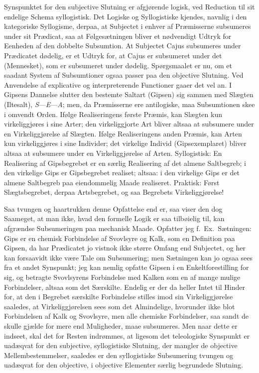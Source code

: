 \documentclass[12pt]{book}
\newcommand{\opage}[1]{\marginnote{\footnotesize\textit{[#1]}}}
\begin{document}
Synspunktet for den subjective Slutning er afgjørende logisk, ved Reduction til sit endelige Schema syllogistisk. Det Logiske og Syllogistiske kjendes, navnlig i den kategoriske Syllogisme, derpaa, at Subjectet i enhver af Præmisserne subsumeres under sit Prædicat, saa at Følgesætningen bliver et nødvendigt Udtryk for Eenheden af den dobbelte Subsumtion. At Subjectet Cajus subsumeres under Prædicatet dødelig, er et Udtryk for, at Cajus er subsumeret under det (Mennesket), som er subsumeret under dødelig. Spørgsmaalet er nu, om et saadant System af Subsumtioner ogsaa passer paa den objective Slutning. Ved Anvendelse af explicative og interpreterende Functioner gaaer det vel an. I Gipsens Dannelse slutter den bestemte Saltart (Gipsen) sig sammen med Slægten (Iltesalt), \textit{S}---\textit{E}---\textit{A}; men, da Præmisserne ere antilogiske, maa Subsumtionen skee i omvendt Orden. Ifølge Realiseringens første Præmis, kan Slægten kun virkeliggjøres i sine Arter; den virkeliggjorte Art bliver altsaa at subsumere under en Virkeliggjørelse af Slægten. Ifølge Realiseringens anden Præmis, kan Arten kun virkeliggjøres i sine Individer; det virkelige Individ (Gipsexemplaret) bliver altsaa at subsumere under en Virkeliggjørelse af Arten. Syllogistisk: En Realisering af Gipsbegrebet er en særlig Realisering af det almene Saltbegreb; i den virkelige Gips er Gipsbegrebet realiset; %
altsaa: i den virkelige Gips er det almene Saltbegreb paa eiendommelig Maade realiseret. Praktisk: Først Slægtsbegrebet, derpaa Artsbegrebet, og saa Begrebets Virkeliggjørelse!

Saa tvungen og haartrukken denne Opfattelse end er, saa viser den dog Saameget, at man ikke, hvad den formelle Logik er saa tilbøielig til, kan afgrændse Subsumeringen paa mechanisk Maade. Opfatter jeg f.\ Ex.\ Sætningen: Gips er en chemisk Forbindelse af Svovlsyre og Kalk, som en Definition paa Gipsen, da har Prædicatet jo vistnok ikke større Omfang end
\opage{399}Subjectet, og her kan forsaavidt ikke være Tale om Subsumering; men Sætningen kan jo ogsaa sees fra et andet Synspunkt; jeg kan nemlig opfatte Gipsen i en Enkeltforestilling for sig, og betragte Svovlsyrens Forbindelse med Kalken som en af mange mulige Forbindelser, altsaa som det Særskilte. Endelig er der da heller Intet til Hinder for, at den i Begrebet særskilte Forbindelse stilles imod sin Virkeliggjørelse saaledes, at Virkeliggjørelsen sees som det Almindelige, hvorunder ikke blot Forbindelsen af Kalk og Svovlsyre, men alle chemiske Forbindelser, saa sandt de skulle gjælde for mere end Muligheder, maae subsumeres. Men naar dette er indseet, skal det for Resten indrømmes, at ligesom det teleologiske Synspunkt er uadæqvat for den subjective, syllogistiske Slutning, der mangler de objective Mellembestemmelser, saaledes er den syllogistiske Subsumering tvungen og uadæqvat for den objective, i objective Elementer særlig begrundede Slutning.
\end{document}
